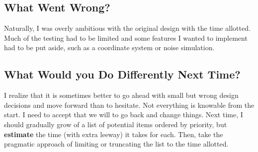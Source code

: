 \documentclass{article}
\begin{document}
\subsection{What Went Wrong?}
Naturally, I was overly ambitious with the original design with the time allotted.
Much of the testing had to be limited and some features I wanted
to implement had to be put aside, such as a coordinate system
or noise simulation. 

\subsection{What Would you Do Differently Next Time?}
I realize that it is sometimes better to go ahead with small but wrong design decisions
and move forward than to hesitate. Not everything is knowable from the start.
I need to accept that we will to go back and change things.
Next time, I should gradually grow of a list of potential items ordered by priority,
but \textbf{estimate} the time (with extra leeway) it takes for each.
Then, take the pragmatic approach of limiting or
truncating the list to the time allotted.
\end{document}
